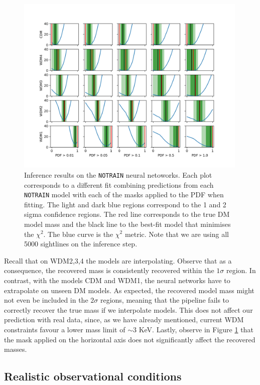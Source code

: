 \begin{figure}
    \centering
    \includegraphics[width=0.99\textwidth]{img/ML/inference_no_train.png}
    \caption{Inference results on the \texttt{NOTRAIN} neural netoworks. Each plot corresponds to a different fit combining predictions from each \texttt{NOTRAIN} model with each of the masks applied to the PDF when fitting. The light and dark blue regions correspond to the 1 and 2 sigma confidence regions. The red line corresponds to the true DM model mass and the black line to the best-fit model that minimises the $\chi^2$. The blue curve is the $\chi^2$ metric. Note that we are using all 5000 sightlines on the inference step.}
    \label{fig:inference no train}
\end{figure}
Recall that on WDM2,3,4 the models are interpolating. Observe that as a consequence, the recovered mass is consistently recovered within the $1\sigma$ region. In contrast, with the models CDM and WDM1, the neural networks have to extrapolate on unseen DM models. As expected, the recovered model mass might not even be included in the $2\sigma$ regions, meaning that the pipeline fails to correctly recover the true mass if we interpolate models. This does not affect our prediction with real data, since, as we have already mentioned, current WDM constraints favour a lower mass limit of $\sim 3$ KeV. Lastly, observe in Figure \ref{fig:inference no train} that the mask applied on the horizontal axis does not significantly affect the recovered masses.


\subsection{Realistic observational conditions}\label{sec:hires test}

